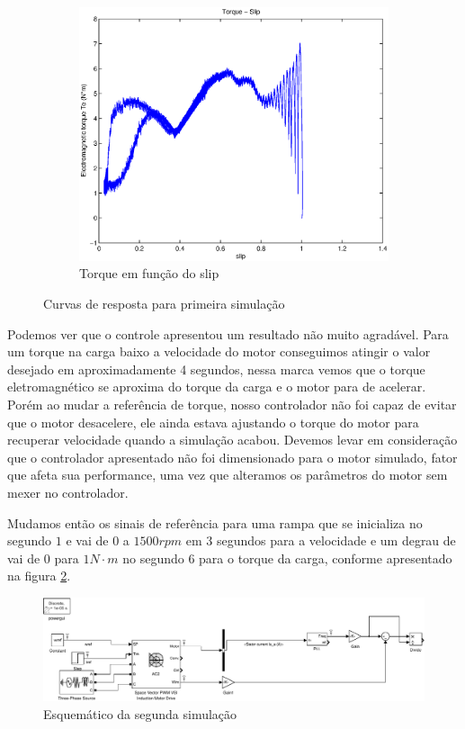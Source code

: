 \documentclass{article}
\begin{document}
\begin{figure}[H]
\begin{subfigure}[b]{0.49\linewidth}
		\centering
		\includegraphics[width=\linewidth]{matlab/ts}
		\caption{Torque em função do slip}
	\end{subfigure}
	\caption{Curvas de resposta para primeira simulação}
	\label{fig:s1}
\end{figure}

Podemos ver que o controle apresentou um resultado não muito agradável. Para um torque na carga baixo a velocidade do motor conseguimos atingir o valor desejado em aproximadamente 4 segundos, nessa marca vemos que o torque eletromagnético se aproxima do torque da carga e o motor para de acelerar. Porém ao mudar a referência de torque, nosso controlador não foi capaz de evitar que o motor desacelere, ele ainda estava ajustando o torque do motor para recuperar velocidade quando a simulação acabou. Devemos levar em consideração que o controlador apresentado não foi dimensionado para o motor simulado, fator que afeta sua performance, uma vez que alteramos os parâmetros do motor sem mexer no controlador.


Mudamos então os sinais de referência para uma rampa que se inicializa no segundo $1$ e vai de $0$ a $1500 rpm$ em 3 segundos para a velocidade e um degrau de vai de $0$ para $1 N \cdot m$ no segundo 6 para o torque da carga, conforme apresentado na figura \ref{fig:sim2}.

\begin{figure}[H]
	\centering
	\includegraphics[width=\linewidth]{matlab/sim1}
	\caption{Esquemático da segunda simulação}
	\label{fig:sim2}
\end{figure}
\end{document}
